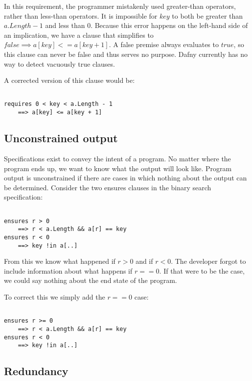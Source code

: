 \documentclass[sigplan,screen,anonymous]{acmart}
\begin{document}
In this requirement, the programmer mistakenly used greater-than operators, rather than less-than
operators. It is impossible for \(key\) to both be greater than \(a.Length - 1\) and less than \(0\). Because this error happens on the left-hand side of an implication, we have a clause that
simplifies to \(false \implies a[key] <= a[key + 1] \). A false premise always evaluates to \(true\), so this clause can never be false and thus serves no purpose. Dafny currently has no
way to detect vacuously true clauses.

A corrected version of this clause would be:

\begin{lstlisting}[language=dafny]

requires 0 < key < a.Length - 1
    ==> a[key] <= a[key + 1]

\end{lstlisting}

\subsection{Unconstrained output}

Specifications exist to convey the intent of a program. No matter where the program ends up, we want to know what the output will look like. Program output is unconstrained if there are cases in which nothing about the output can be determined. Consider the two ensures clauses in the binary search specification:

\begin{lstlisting}[language=dafny]

ensures r > 0
    ==> r < a.Length && a[r] == key
ensures r < 0
    ==> key !in a[..]

\end{lstlisting}

From this we know what happened if \(r > 0\) and if \(r < 0\). The developer forgot to include
information about what happens if \(r == 0\). If that were to be the case, we could say nothing about the end state of the program.

To correct this we simply add the \(r == 0\) case:

\begin{lstlisting}[language=dafny]

ensures r >= 0
    ==> r < a.Length && a[r] == key
ensures r < 0
    ==> key !in a[..]

\end{lstlisting}

\subsection{Redundancy}
\end{document}
